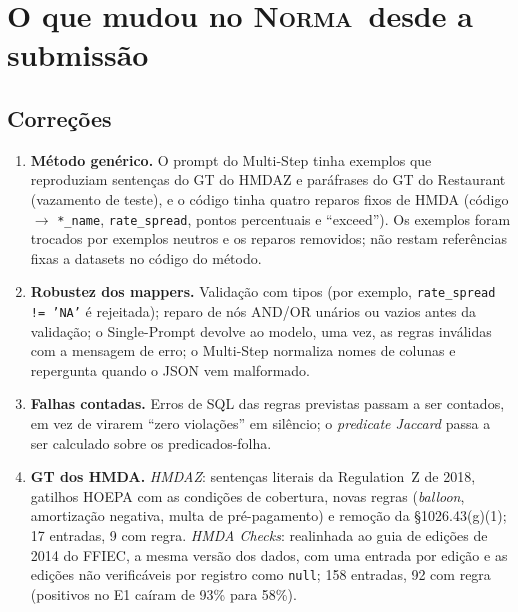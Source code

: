 \documentclass[11pt,a4paper]{article}
\newcommand{\system}{\textsc{Norma}}
\begin{document}
\section{O que mudou no \system\ desde a submissão}
\label{sec:mudancas}

\subsection{Correções}
\begin{enumerate}
  \item \textbf{Método genérico.} O prompt do Multi-Step tinha exemplos que reproduziam sentenças do GT do HMDAZ e
        paráfrases do GT do Restaurant (vazamento de teste), e o código tinha quatro reparos fixos de HMDA
        (código $\rightarrow$ \texttt{*\_name}, \texttt{rate\_spread}, pontos percentuais e ``exceed''). Os
        exemplos foram trocados por exemplos neutros e os reparos removidos; não restam referências fixas a
        datasets no código do método.
  \item \textbf{Robustez dos mappers.} Validação com tipos (por exemplo, \texttt{rate\_spread != 'NA'} é
        rejeitada); reparo de nós AND/OR unários ou vazios antes da validação; o Single-Prompt devolve ao modelo,
        uma vez, as regras inválidas com a mensagem de erro; o Multi-Step normaliza nomes de colunas e
        repergunta quando o JSON vem malformado.
  \item \textbf{Falhas contadas.} Erros de SQL das regras previstas passam a ser contados, em vez de virarem
        ``zero violações'' em silêncio; o \emph{predicate Jaccard} passa a ser calculado sobre os
        predicados-folha.
  \item \textbf{GT dos HMDA.} \emph{HMDAZ}: sentenças literais da Regulation~Z de 2018, gatilhos HOEPA com as
        condições de cobertura, novas regras (\emph{balloon}, amortização negativa, multa de pré-pagamento) e
        remoção da §1026.43(g)(1); 17 entradas, 9 com regra. \emph{HMDA Checks}: realinhada ao guia de edições de
        2014 do FFIEC, a mesma versão dos dados, com uma entrada por edição e as edições não verificáveis por
        registro como \texttt{null}; 158 entradas, 92 com regra (positivos no E1 caíram de 93\% para 58\%).
\end{enumerate}
\end{document}
